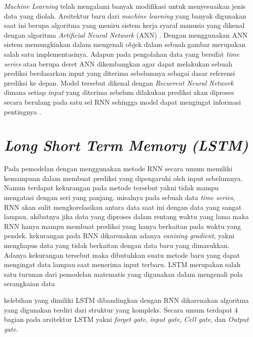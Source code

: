 \textit{Machine Learning} telah mengalami banyak modifikasi untuk menyesuaikan jenis data yang diolah.  Arsitektur baru dari \textit{machine learning} yang banyak digunakan saat ini berupa algoritma yang meniru sistem kerja syaraf manusia yang dikenal dengan algoritma \textit{Artificial Neural Network} (ANN) \cite{braspenning1995artificial}. Dengan menggunakan ANN sistem memungkinkan dalam mengenali objek dalam sebuah gambar merupakan salah satu implementasinya. Adapun pada pengolahan data yang bersifat \textit{time series} atau berupa deret ANN dikembangkan agar dapat melakukan sebuah prediksi berdasarkan input yang diterima sebelumnya sebagai dasar referensi prediksi ke depan. Model tersebut dikenal dengan \textit{Recurrent Neural Network} dimana setiap \textit{input} yang diterima sebelum dilakukan prediksi akan diproses secara berulang pada satu sel RNN sehingga model dapat mengingat informasi pentingnya \cite{medsker2001recurrent}.


\section{\textit{Long Short Term Memory (LSTM)}}
Pada pemodelan dengan menggunakan metode RNN secara umum memiliki kemampuan dalam membuat prediksi yang dipengaruhi oleh input sebelumnya. Namun terdapat kekurangan pada metode tersebut yakni tidak mampu mengatasi dengan  seri yang panjang. misalnya pada sebuah data \textit{time series}, RNN akan sulit mengkorelasikan antara data saat ini dengan data yang sangat lampau, akibatnya jika data yang diproses dalam rentang waktu yang lama maka RNN hanya mampu membuat prediksi yang hanya berkaitan pada waktu yang pendek. kekurangan pada RNN dikarenakan adanya \textit{vanising gradient}, yakni menghapus data yang tidak berkaitan dengan data baru yang dimasukkan. Adanya kekurangan tersebut maka dibutuhkan suatu metode baru yang dapat mengingat data lampau saat menerima input terbaru. 
LSTM merupakan salah satu turunan dari pemodelan matematis yang digunakan dalam mengenali pola serangkaian data 

kelebihan yang dimiliki LSTM dibandingkan dengan RNN dikarenakan algoritma yang digunakan terdiri dari struktur yang kompleks. Secara umum terdapat 4 bagian pada arsitektur LSTM yakni \textit{forget gate}, \textit{input gate}, \textit{Cell gate}, dan \textit{Output gate}. 
